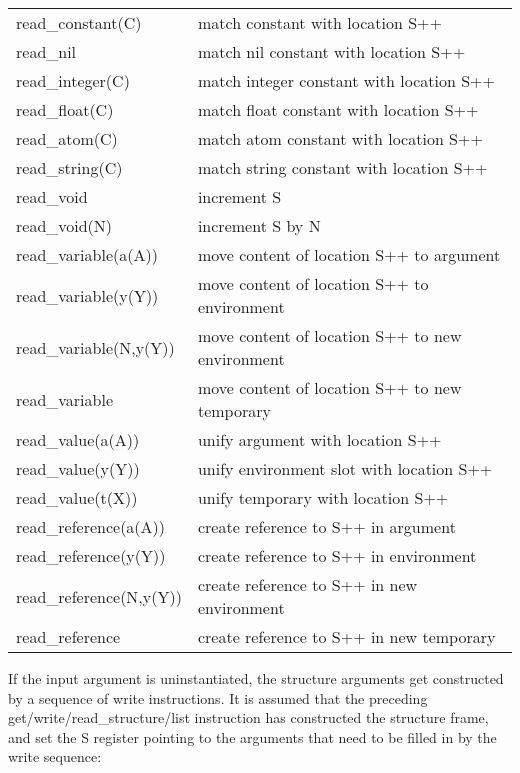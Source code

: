 \begin{tabular}{|p{}|p{}|}
\hline
read_constant(C)          & match constant with location S++ \\
read_nil                  & match nil constant with location S++ \\
read_integer(C)           & match integer constant with location S++ \\
read_float(C)             & match float constant with location S++ \\
read_atom(C)              & match atom constant with location S++ \\
read_string(C)            & match string constant with location S++ \\
read_void                 & increment S \\
read_void(N)              & increment S by N \\
read_variable(a(A))       & move content of location S++ to argument \\
read_variable(y(Y))       & move content of location S++ to environment \\
read_variable(N,y(Y))     & move content of location S++ to new environment \\
read_variable             & move content of location S++ to new temporary  \\
read_value(a(A))          & unify argument with location S++ \\
read_value(y(Y))          & unify environment slot with location S++ \\
read_value(t(X))          & unify temporary with location S++ \\
read_reference(a(A))      & create reference to S++ in argument \\
read_reference(y(Y))      & create reference to S++ in environment \\
read_reference(N,y(Y))    & create reference to S++ in new environment \\
read_reference            & create reference to S++ in new temporary \\
\hline
\end{tabular}

If the input argument is uninstantiated, the structure arguments get
constructed by a sequence of write instructions. It is assumed that the
preceding get/write/read_structure/list instruction has constructed the
structure frame, and set the S register pointing to the arguments that
need to be filled in by the write sequence:


